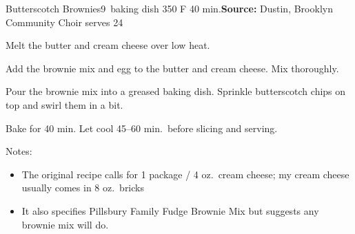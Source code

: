 \begin{recipe}{Butterscotch Brownies}{9\inch{}\inch\ baking dish \hfill 350\0 F \hfill 40 min.}{\textbf{Source:} Dustin, Brooklyn Community Choir \hfill serves 24}

 Melt the butter and cream cheese over low heat.

 Add the brownie mix and egg to the butter and cream cheese. Mix thoroughly.

 Pour the brownie mix into a greased baking dish. Sprinkle butterscotch chips on top and swirl them in a bit.

 \newstep Bake for 40 min. Let cool 45--60 min.\ before slicing and serving.

 \freeform Notes:
 \begin{itemize}
  \item The original recipe calls for 1 package / 4 oz.\ cream cheese; my cream cheese usually comes in 8 oz.\ bricks
  \item It also specifies Pillsbury Family Fudge Brownie Mix but suggests any brownie mix will do.
 \end{itemize}
\end{recipe}
